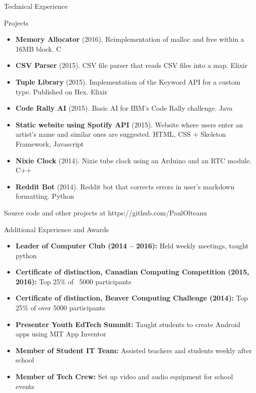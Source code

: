 \documentclass[]{mcdowellcv}
\begin{document}
	\begin{cvsection}{Technical Experience}
		\begin{cvsubsection}{Projects}{}{}
			\begin{itemize}
				\item \textbf{Memory Allocator} (2016). Reimplementation of malloc and free within a 16MB block.  C
				\item \textbf{CSV Parser} (2015). CSV file parser that reads CSV files into a map.  Elixir
				\item \textbf{Tuple Library} (2015). Implementation of the Keyword API for a custom type. Published on Hex.  Elixir
				\item \textbf{Code Rally AI} (2015). Basic AI for IBM's Code Rally challenge.  Java
				\item \textbf{Static website using Spotify API} (2015). Website where users enter an artist's name and similar ones are suggested.  HTML, CSS + Skeleton Framework, Javascript
				\item \textbf{Nixie Clock} (2014). Nixie tube clock using an Arduino and an RTC module.  C++
				\item \textbf{Reddit Bot} (2014). Reddit bot that corrects errors in user's markdown formatting.  Python
			\end{itemize}
            Source code and other projects at https://github.com/PaulOlteanu
		\end{cvsubsection}
	\end{cvsection}

	\begin{cvsection}{Additional Experience and Awards}
		\begin{cvsubsection}{}{}{}
			\begin{itemize}
				\item \textbf{Leader of Computer Club (2014 – 2016):} Held weekly meetings, taught python
				\item \textbf{Certificate of distinction, Canadian Computing Competition (2015, 2016):} Top 25\% of ~5000 participants
				\item \textbf{Certificate of distinction, Beaver Computing Challenge (2014):} Top 25\% of over 5000 participants
				\item \textbf{Presenter Youth EdTech Summit:} Taught students to create Android apps using MIT App Inventor
				\item \textbf{Member of Student IT Team:} Assisted teachers and students weekly after school
				\item \textbf{Member of Tech Crew:} Set up video and audio equipment for school events
			\end{itemize}
		\end{cvsubsection}
	\end{cvsection}
\end{document}
